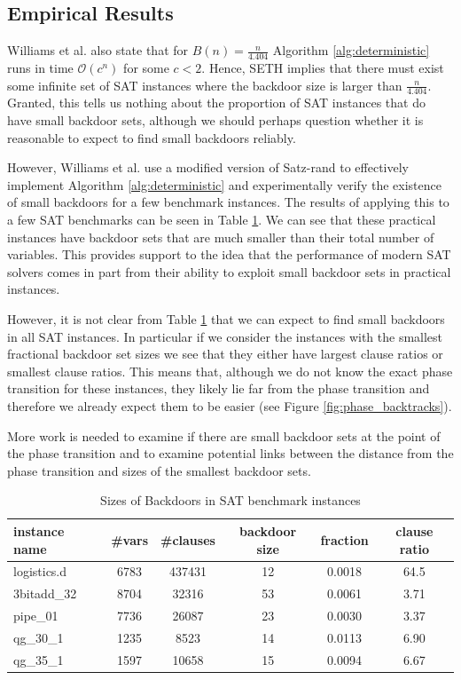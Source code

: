 \subsection{Empirical Results}
Williams et al. also state that for $B(n) = \frac{n}{4.404}$
Algorithm \ref{alg:deterministic} runs in time $\mathcal{O}(c^n)$ for
some $c < 2$. Hence, SETH implies that there must exist some infinite
set of SAT instances where the backdoor size is larger than $\frac{n}{4.404}$.
Granted, this tells us nothing about the proportion of SAT instances that do
have small backdoor sets, although we should perhaps question whether
it is reasonable to expect to find small backdoors reliably.

However, Williams et al. use a modified version of
Satz-rand \cite{kautz1999unifying} to effectively implement
Algorithm \ref{alg:deterministic} and experimentally verify the existence of small backdoors
for a few benchmark instances. The results of applying this to a few
SAT benchmarks can be seen in Table \ref{tab:backdoor_sizes}.
We can see that these practical instances have backdoor sets that are
much smaller than their total number of variables. This provides support
to the idea that the performance of modern SAT solvers comes in part
from their ability to exploit small backdoor sets in practical instances.

However, it is not clear from Table \ref{tab:backdoor_sizes} that we can expect
to find small backdoors in all SAT instances. In particular if we consider the
instances with the smallest fractional backdoor set sizes we see that they either have
largest clause ratios or smallest clause ratios. This means that, although we do not know the exact
phase transition for these instances, they likely lie far from the phase transition and therefore
we already expect them to be easier (see Figure \ref{fig:phase_backtracks}).

More work is needed to examine if there are small backdoor sets at the point of the
phase transition and to examine potential links between the distance from the phase
transition and sizes of the smallest backdoor sets.

\begin{table}[]
    \centering
    \begin{tabular}{l c c c c c}
        \toprule
        instance name & \#vars & \#clauses & backdoor size & fraction & clause ratio\\
        \midrule
        logistics.d & 6783 & 437431 & 12 & 0.0018 & 64.5\\
        3bitadd\_32 & 8704 & 32316 & 53 & 0.0061 & 3.71\\ 
        pipe\_01 & 7736 & 26087 & 23 & 0.0030 & 3.37\\
        qg\_30\_1 & 1235 & 8523 & 14 & 0.0113 & 6.90\\
        qg\_35\_1 & 1597 & 10658 & 15 & 0.0094 & 6.67\\
        \bottomrule
    \end{tabular}
    \caption{Sizes of Backdoors in SAT benchmark instances \cite{backdoor_typical}}
    \label{tab:backdoor_sizes}
\end{table}

